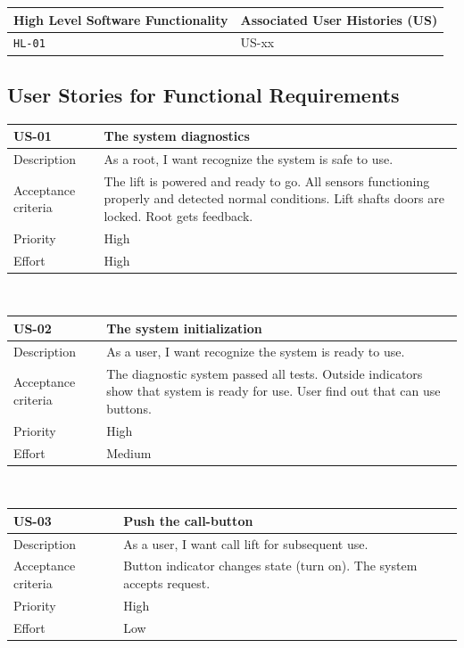 \documentclass[a4paper,11pt]{article}
\begin{document}
\noindent\begin{tabularx}{\textwidth}{|C{4cm}|Y|}
  \hline
  High Level Software Functionality & Associated User Histories (US)\\
  \hline
  \texttt{HL-01} & US-xx\\
  \hline
\end{tabularx}

\subsection{User Stories for Functional Requirements}
\label{sub:User Stories for Functional Requirements}

\noindent\begin{tabularx}{\textwidth}{|C{2cm}|Y|}
  \hline
  \textbf{US-01} & \textbf{The system diagnostics}\\
  \hline
  Description &
  As a root, I want recognize the system is safe to use.
  \\
  \hline
  Acceptance criteria &
  The lift is powered and ready to go. All sensors functioning properly and detected normal conditions. Lift shafts doors are locked. Root gets feedback.\\
  \hline
  Priority & High\\
  \hline
  Effort & High\\
  \hline
\end{tabularx}\\[15pt]

\noindent\begin{tabularx}{\textwidth}{|C{2cm}|Y|}
  \hline
  \textbf{US-02} & \textbf{The system initialization}\\
  \hline
  Description &
  As a user, I want recognize the system is ready to use.
  \\
  \hline
  Acceptance criteria &
  The diagnostic system passed all tests. Outside indicators show that system is ready for use. User find out that can use buttons. \\
  \hline
  Priority & High\\
  \hline
  Effort & Medium\\
  \hline
\end{tabularx}\\[15pt]

\noindent\begin{tabularx}{\textwidth}{|C{2cm}|Y|}
  \hline
  \textbf{US-03} & \textbf{Push the call-button}\\
  \hline
  Description &
  As a user, I want call lift for subsequent use.\\
  \hline
  Acceptance criteria &
  Button indicator changes state (turn on). The system accepts request.\\
  \hline
  Priority & High\\
  \hline
  Effort & Low\\
  \hline
\end{tabularx}\\[15pt]
\end{document}
